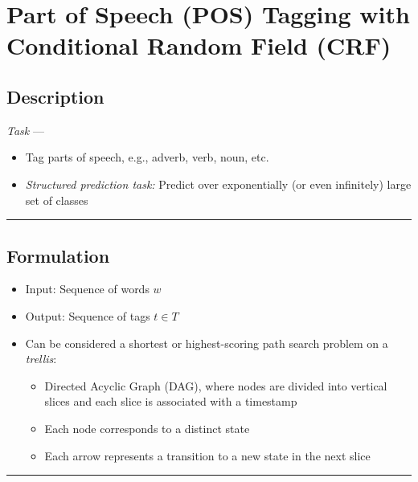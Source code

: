 \section{Part of Speech (POS) Tagging with Conditional Random Field (CRF)}
\subsection*{Description}
\emph{Task} --- 
\begin{itemize}
    \item Tag parts of speech, e.g., adverb, verb, noun, etc.
    \item \emph{Structured prediction task:} Predict over exponentially (or even infinitely) large set of classes
\end{itemize}

{\color{black}\hrule height 0.001mm}

\subsection*{Formulation}
\begin{itemize}
    \item Input: Sequence of words $w$
    \item Output: Sequence of tags $t \in T$
    \item Can be considered a shortest or highest-scoring path search problem on a \emph{trellis}:
    \begin{itemize}
        \item Directed Acyclic Graph (DAG), where nodes are divided into vertical slices and each slice is associated with a timestamp
        \item Each node corresponds to a distinct state
        \item Each arrow represents a transition to a new state in the next slice
    \end{itemize}
\end{itemize}

{\color{lightgrey}\hrule height 0.001mm}

